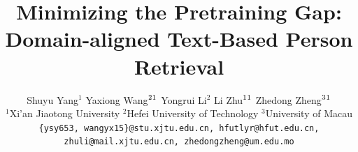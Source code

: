 \documentclass[10pt,twocolumn,letterpaper]{article}
\title{Minimizing the Pretraining Gap: Domain-aligned Text-Based Person Retrieval}
\author{Shuyu Yang$^1$ \quad 
Yaxiong Wang$^{2}\footnotemark[1]$ \quad 
Yongrui Li$^{2}$ \quad 
Li Zhu$^{1}\footnotemark[1]$ \quad 
Zhedong Zheng$^3\footnotemark[1]$ \\
$^1$Xi'an Jiaotong University \quad 
$^2$Hefei University of Technology \quad 
$^3$University of Macau\\
{\tt\small \{ysy653, wangyx15\}@stu.xjtu.edu.cn, 
hfutlyr@hfut.edu.cn,} \\
{\tt\small zhuli@mail.xjtu.edu.cn, 
zhedongzheng@um.edu.mo}
}
\begin{document}
\maketitle
    






{
    \small
    
    
}
\end{document}
